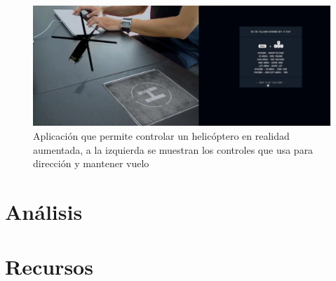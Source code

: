 \documentclass[a4paper]{article}
\begin{document}
\begin{figure}[h!]
  \centering
  \includegraphics[width=0.95\linewidth, keepaspectratio]{helicopteroAR}
  \caption{Aplicación que permite controlar un helicóptero en realidad aumentada, a la izquierda se muestran los controles que usa para dirección y mantener vuelo}
  \label{fig:Helicoptero AR}
\end{figure}

\section{Análisis}
\section{Recursos}




%

\end{document}
